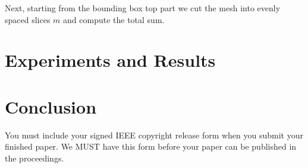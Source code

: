 \documentclass[10pt,twocolumn,letterpaper]{article}
\begin{document}
Next, starting from the bounding box top part we cut the mesh into evenly 
spaced slices $m$ and compute the total sum. 

\section{Experiments and Results}


\section{Conclusion}

You must include your signed IEEE copyright release form when you submit
your finished paper. We MUST have this form before your paper can be
published in the proceedings.

{\small


}
\end{document}
